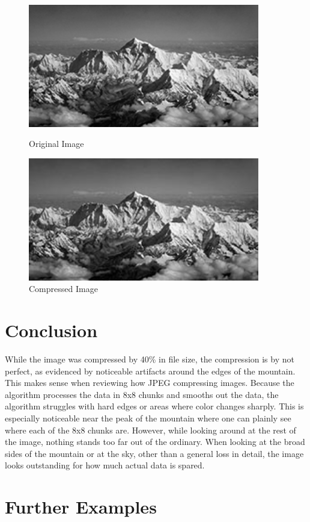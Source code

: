 \documentclass[11pt]{article}
\begin{document}
\begin{figure}
  \centering
  \begin{minipage}{0.45\textwidth}
      \centering
      \includegraphics[width=0.9\textwidth]{./images/original.jpg}
      \caption{Original Image}
      \label{fig:original}
  \end{minipage}\hfill
  \begin{minipage}{0.45\textwidth}
      \centering
      \includegraphics[width=0.9\textwidth]{./images/compressed.jpg}
      \caption{Compressed Image}
      \label{fig:compressed}
  \end{minipage}
\end{figure}

\section{Conclusion}
\label{sec: conclusion}

While the image was compressed by 40\% in file size, the compression is by not perfect, as evidenced by noticeable artifacts around the edges of the mountain.
This makes sense when reviewing how JPEG compressing images.
Because the algorithm processes the data in 8x8 chunks and smooths out the data, the algorithm struggles with hard edges or areas where color changes sharply.
This is especially noticeable near the peak of the mountain where one can plainly see where each of the 8x8 chunks are.
However, while looking around at the rest of the image, nothing stands too far out of the ordinary.
When looking at the broad sides of the mountain or at the sky, other than a general loss in detail, the image looks outstanding for how much actual data is spared.

\section{Further Examples}
\label{sec: furtherexamples}

\begingroup
  \raggedright
  \nocite{*}
  
  
\endgroup
\end{document}
